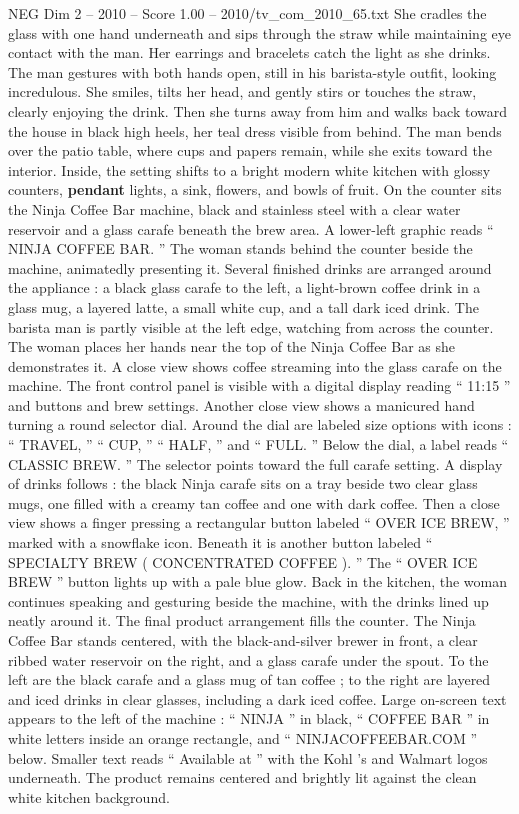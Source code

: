 \begin{textsample}{NEG Dim 2 – 2010 – Score 1.00 – 2010/tv\_com\_2010\_65.txt}
She cradles the glass with one hand underneath and sips through the straw while maintaining eye contact with the man.
Her earrings and bracelets catch the light as she drinks.
The man gestures with both hands open, still in his barista-style outfit, looking incredulous.
She smiles, tilts her head, and gently stirs or touches the straw, clearly enjoying the drink.
Then she turns away from him and walks back toward the house in black high heels, her teal dress visible from behind.
The man bends over the patio table, where cups and papers remain, while she exits toward the interior.
Inside, the setting shifts to a bright modern white kitchen with glossy counters, \textbf{pendant} lights, a sink, flowers, and bowls of fruit.
On the counter sits the Ninja Coffee Bar machine, black and stainless steel with a clear water reservoir and a glass carafe beneath the brew area.
A lower-left graphic reads “ NINJA COFFEE BAR. ” The woman stands behind the counter beside the machine, animatedly presenting it.
Several finished drinks are arranged around the appliance : a black glass carafe to the left, a light-brown coffee drink in a glass mug, a layered latte, a small white cup, and a tall dark iced drink.
The barista man is partly visible at the left edge, watching from across the counter.
The woman places her hands near the top of the Ninja Coffee Bar as she demonstrates it.
A close view shows coffee streaming into the glass carafe on the machine.
The front control panel is visible with a digital display reading “ 11:15 ” and buttons and brew settings.
Another close view shows a manicured hand turning a round selector dial.
Around the dial are labeled size options with icons : “ TRAVEL, ” “ CUP, ” “ HALF, ” and “ FULL. ” Below the dial, a label reads “ CLASSIC BREW. ” The selector points toward the full carafe setting.
A display of drinks follows : the black Ninja carafe sits on a tray beside two clear glass mugs, one filled with a creamy tan coffee and one with dark coffee.
Then a close view shows a finger pressing a rectangular button labeled “ OVER ICE BREW, ” marked with a snowflake icon.
Beneath it is another button labeled “ SPECIALTY BREW ( CONCENTRATED COFFEE ). ” The “ OVER ICE BREW ” button lights up with a pale blue glow.
Back in the kitchen, the woman continues speaking and gesturing beside the machine, with the drinks lined up neatly around it.
The final product arrangement fills the counter.
The Ninja Coffee Bar stands centered, with the black-and-silver brewer in front, a clear ribbed water reservoir on the right, and a glass carafe under the spout.
To the left are the black carafe and a glass mug of tan coffee ; to the right are layered and iced drinks in clear glasses, including a dark iced coffee.
Large on-screen text appears to the left of the machine : “ NINJA ” in black, “ COFFEE BAR ” in white letters inside an orange rectangle, and “ NINJACOFFEEBAR.COM ” below.
Smaller text reads “ Available at ” with the Kohl ’s and Walmart logos underneath.
The product remains centered and brightly lit against the clean white kitchen background.

\end{textsample}
